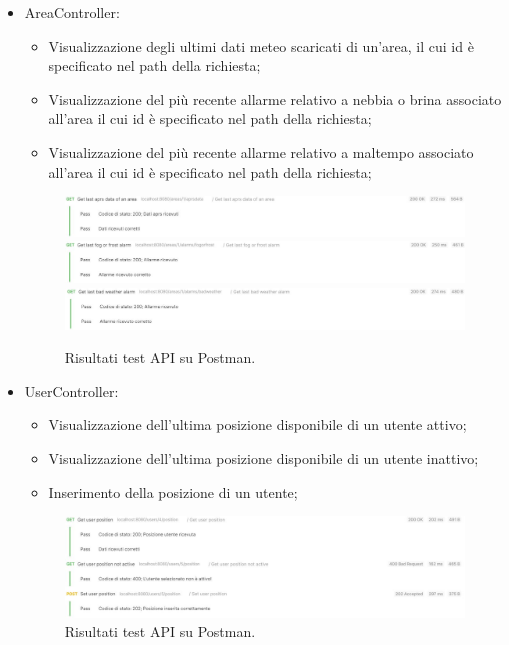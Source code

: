 \begin{itemize}
	\item AreaController:
	\begin{itemize}
		\item Visualizzazione degli ultimi dati meteo scaricati di un'area, il cui id è specificato nel path della richiesta;
		\item Visualizzazione del più recente allarme relativo a nebbia o brina associato all'area il cui id è specificato nel path della richiesta;
		\item Visualizzazione del più recente allarme relativo a maltempo associato all'area il cui id è specificato nel path della richiesta;
	\end{itemize}

	\begin{figure}[h!]
		\centering
		\includegraphics[width=1\linewidth]{./Iterazione 3/ImageFiles/TestGetAprsData}
		\includegraphics[width=1\linewidth]{./Iterazione 3/ImageFiles/TestGetFrostOrFogAlarm}
		\includegraphics[width=1\linewidth]{./Iterazione 3/ImageFiles/TestGetBadWeatherAlarm}		
		\caption{Risultati test API su Postman.}
		\label{fig:RisultatiTestAPIIT3}
	\end{figure}

\clearpage

	\item UserController:
	\begin{itemize}
		\item Visualizzazione dell'ultima posizione disponibile di un utente attivo;
		\item Visualizzazione dell'ultima posizione disponibile di un utente inattivo;
		\item Inserimento della posizione di un utente;
	\end{itemize}
	\begin{figure}[h!]
		\centering
		\includegraphics[width=1\linewidth]{./Iterazione 3/ImageFiles/TestUserController}
		\caption{Risultati test API su Postman.}
		\label{fig:RisultatiTestAPIIT3_2}
	\end{figure}
\end{itemize}

